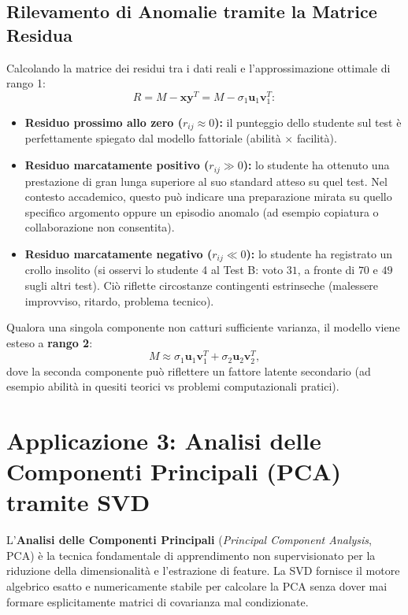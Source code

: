 \subsection{Rilevamento di Anomalie tramite la Matrice Residua}

Calcolando la matrice dei residui tra i dati reali e l'approssimazione ottimale di rango 1:
\begin{equation}
    R = M - \mathbf{x}\mathbf{y}^T = M - \sigma_1 \mathbf{u}_1 \mathbf{v}_1^T:
\end{equation}
\begin{itemize}
    \item \textbf{Residuo prossimo allo zero ($r_{ij} \approx 0$):} il punteggio dello studente sul test \`e perfettamente spiegato dal modello fattoriale (abilit\`a $\times$ facilit\`a).
    \item \textbf{Residuo marcatamente positivo ($r_{ij} \gg 0$):} lo studente ha ottenuto una prestazione di gran lunga superiore al suo standard atteso su quel test. Nel contesto accademico, questo pu\`o indicare una preparazione mirata su quello specifico argomento oppure un episodio anomalo (ad esempio copiatura o collaborazione non consentita).
    \item \textbf{Residuo marcatamente negativo ($r_{ij} \ll 0$):} lo studente ha registrato un crollo insolito (si osservi lo studente 4 al Test B: voto $31$, a fronte di $70$ e $49$ sugli altri test). Ci\`o riflette circostanze contingenti estrinseche (malessere improvviso, ritardo, problema tecnico).
\end{itemize}

Qualora una singola componente non catturi sufficiente varianza, il modello viene esteso a \textbf{rango 2}:
\begin{equation}
    M \approx \sigma_1 \mathbf{u}_1 \mathbf{v}_1^T + \sigma_2 \mathbf{u}_2 \mathbf{v}_2^T,
\end{equation}
dove la seconda componente pu\`o riflettere un fattore latente secondario (ad esempio abilit\`a in quesiti teorici vs problemi computazionali pratici).

\FloatBarrier
\section{Applicazione 3: Analisi delle Componenti Principali (PCA) tramite SVD}
\label{sec:applicazione-pca-svd}

L'\textbf{Analisi delle Componenti Principali} (\textit{Principal Component Analysis}, PCA) \`e la tecnica fondamentale di apprendimento non supervisionato per la riduzione della dimensionalit\`a e l'estrazione di feature. La SVD fornisce il motore algebrico esatto e numericamente stabile per calcolare la PCA senza dover mai formare esplicitamente matrici di covarianza mal condizionate.

